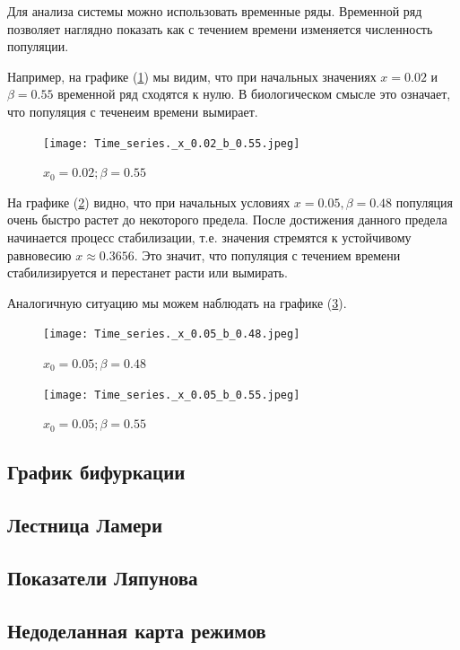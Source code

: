         Для анализа системы можно использовать временные ряды. Временной ряд позволяет наглядно показать как с течением времени изменяется численность популяции.

        Например, на графике (\ref{timeSeriesX=0.02b=0.55}) мы видим, что при начальных значениях \(x = 0.02\) и \(\beta = 0.55\) временной ряд сходятся к нулю. В биологическом смысле это означает, что популяция с теченеим времени вымирает.
    
        \begin{figure}[h!]
            \centering
            \texttt{[image: Time\_series.\_x\_0.02\_b\_0.55.jpeg]}

            \captionsetup{justification=centering}
            \caption{\(x_0 = 0.02; \beta = 0.55\)}
            \label{timeSeriesX=0.02b=0.55}
        \end{figure}

        На графике (\ref{timeSeriesX=0.05b=0.48}) видно, что при начальных условиях \(x = 0.05, \beta = 0.48\) популяция очень быстро растет до некоторого предела. После достижения данного предела начинается процесс стабилизации, т.е. значения стремятся к устойчивому равновесию \(x \approx 0.3656\). Это значит, что популяция с течением времени стабилизируется и перестанет расти или вымирать.

        Аналогичную ситуацию мы можем наблюдать на графике (\ref{timeSeriesX=0.05b=0.55}).
    
        \begin{figure}[h!]
            \centering
            \texttt{[image: Time\_series.\_x\_0.05\_b\_0.48.jpeg]}

            \captionsetup{justification=centering}
            \caption{\(x_0 = 0.05; \beta = 0.48\)}
            \label{timeSeriesX=0.05b=0.48}
        \end{figure}
    
        \begin{figure}[h!]
            \centering
            \texttt{[image: Time\_series.\_x\_0.05\_b\_0.55.jpeg]}

            \captionsetup{justification=centering}
            \caption{\(x_0 = 0.05; \beta = 0.55\)}
            \label{timeSeriesX=0.05b=0.55}
        \end{figure}

    \subsection{График бифуркации}

    \subsection{Лестница Ламери}

    \subsection{Показатели Ляпунова}

    \subsection{Недоделанная карта режимов}